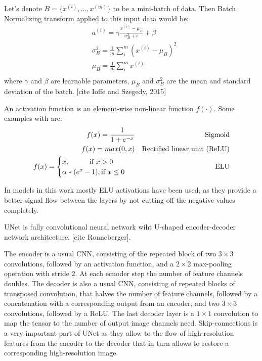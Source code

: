 \begin{definition}
	Let's denote $B = \{x^{(i)}, ..., x^{(m)}\}$ to be a mini-batch of data. Then Batch Normalizing transform applied to this input data would be:
	\begin{equation}
		\begin{split}
		& a^{(i)} = \gamma \frac{x^{(i)} - \mu_B}{\sigma^2_B + \epsilon} + \beta \\
		& \sigma^2_B = \frac{1}{m} \sum_i^m (x^{(i)} - \mu_B)^2 \\
		& \mu_B = \frac{1}{m} \sum_i^m x^{(i)} \\
		\end{split}
	\end{equation}
	where $\gamma$ and $\beta$ are learnable parameters, $\mu_B$ and $\sigma^2_B$ are the mean and standard deviation of the batch.
	[cite Ioffe and Szegedy, 2015]
\end{definition}

\begin{definition}
	An activation function is an element-wise non-linear function $f(\cdot)$. Some examples with are:
	\begin{align}             
		f(x) = \frac{1}{1 + e^{-x}} &&\text{Sigmoid} \\      
		f(x) = max(0, x) &&\text{Rectified linear unit (ReLU)}\\
		f(x) = \begin{cases}
				x, \hspace*{1cm} \textrm{if } x > 0 \\
				\alpha * (e^{x} - 1), \textrm{if }  x \leq 0
		  	\end{cases}\ &&\text{ELU}
		\end{align}
\end{definition}

In models in this work mostly ELU activations have been used, as they provide a better signal flow between the layers by not cutting off the negative values completely.

\begin{definition}[UNet]
	UNet is fully convolutional neural network wiht U-shaped encoder-decoder network architecture. [cite Ronneberger].
\end{definition}

The encoder is a usual CNN, consisting of the repeated
block of two $3 \times 3$ convolutions, followed by
an activation function, and a $2 \times 2$ max-pooling operation with stride 2. At each ecnoder step  the number of feature channels doubles. The decoder is also a usual CNN, consisting of repeated blocks of transposed convolution, that halves the
number of feature channels, followed by a concatenation with a corresponding output from an encoder, and two $3 \times 3$ convolutions, followed by a ReLU. The last decoder layer is a $1 \times 1$ convolution to map the tensor to the number of output image channels need. Skip-connections is a very important part of UNet as they allow to the flow of high-resolution features from the encoder to the decoder that in turn allows to restore a corresponding high-resolution image.

